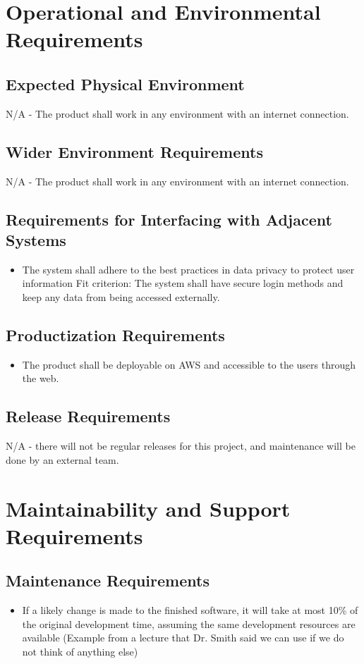\documentclass[12pt]{article}
\begin{document}
\section{Operational and Environmental Requirements}
\subsection{Expected Physical Environment}
N/A - The product shall work in any environment with an internet connection.

\subsection{Wider Environment Requirements}
N/A - The product shall work in any environment with an internet connection.

\subsection{Requirements for Interfacing with Adjacent Systems}
\begin{itemize}
    \item The system shall adhere to the best practices in data privacy to protect user information \hfill \break
    Fit criterion: The system shall have secure login methods and keep any data from being accessed externally.
\end{itemize}

\subsection{Productization Requirements}
\begin{itemize}
    \item The product shall be deployable on AWS and accessible to the users through the web.
\end{itemize}

\subsection{Release Requirements}
N/A - there will not be regular releases for this project, and maintenance will be done by an external team.

\section{Maintainability and Support Requirements}
\subsection{Maintenance Requirements}
\begin{itemize}
    \item If a likely change is made to the finished software, it will take at most 10\% of the original development time, assuming the same development resources are available (Example from a lecture that Dr. Smith said we can use if we do not think of anything else)
\end{itemize}
\end{document}
